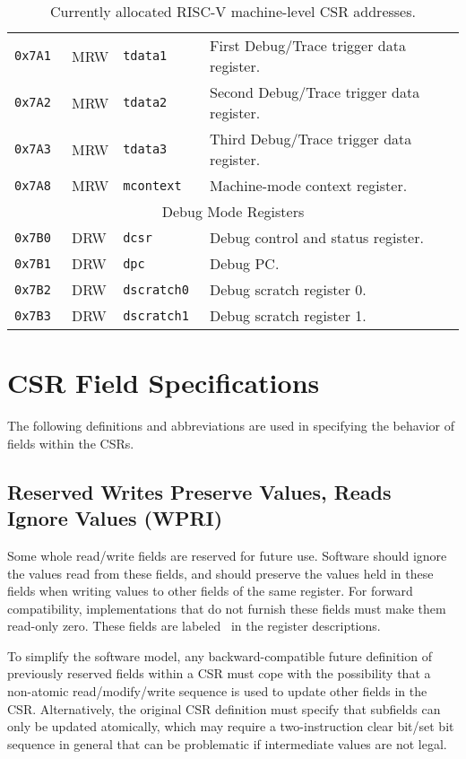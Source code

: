 \begin{table}[htb!]
\begin{center}
\begin{tabular}{|l|l|l|l|}
\tt 0x7A1 & MRW &\tt tdata1 & First Debug/Trace trigger data register. \\
\tt 0x7A2 & MRW &\tt tdata2 & Second Debug/Trace trigger data register. \\
\tt 0x7A3 & MRW &\tt tdata3 & Third Debug/Trace trigger data register. \\
\tt 0x7A8 & MRW &\tt mcontext & Machine-mode context register. \\
\hline
\multicolumn{4}{|c|}{Debug Mode Registers } \\
\hline
\tt 0x7B0 & DRW &\tt dcsr & Debug control and status register. \\
\tt 0x7B1 & DRW &\tt dpc & Debug PC. \\
\tt 0x7B2 & DRW &\tt dscratch0 & Debug scratch register 0. \\
\tt 0x7B3 & DRW &\tt dscratch1 & Debug scratch register 1. \\
\hline
\end{tabular}
\end{center}
\caption{Currently allocated RISC-V machine-level CSR addresses.}
\label{mcsrnames1}
\end{table}

\clearpage

\section{CSR Field Specifications}


The following definitions and abbreviations are used in specifying the
behavior of fields within the CSRs.

\subsection*{Reserved Writes Preserve Values, Reads Ignore Values (WPRI)}

Some whole read/write fields are reserved for future use.  Software
should ignore the values read from these fields, and should preserve
the values held in these fields when writing values to other fields of
the same register.
For forward compatibility, implementations that do not furnish these fields
must make them read-only zero.
These fields are labeled \wpri\ in the register descriptions.

\begin{commentary}
To simplify the software model, any backward-compatible future
definition of previously reserved fields within a CSR must cope with
the possibility that a non-atomic read/modify/write sequence is used
to update other fields in the CSR.  Alternatively, the original CSR
definition must specify that subfields can only be updated atomically,
which may require a two-instruction clear bit/set bit sequence in
general that can be problematic if intermediate values are not legal.
\end{commentary}

